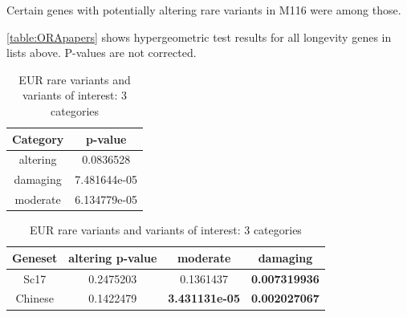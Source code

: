 \documentclass{article}\usepackage[]{graphicx}\usepackage[dvipsnames]{xcolor}
\begin{document}
Certain genes with  potentially altering rare variants in M116 were among those.

\autoref{table:ORApapers} shows hypergeometric test results for all longevity genes in lists above. P-values are not corrected.

\begin{table}[h!]
\centering
 \caption{EUR rare variants and variants of interest: 3 categories}
 \begin{tabular}{|c  c|} 
 \hline
Category  &  p-value \\ [0.5ex] 
 \hline\hline
altering & 0.0836528 \\
damaging &   7.481644e-05 \\
moderate & 6.134779e-05  \\[1ex] 
 \hline
 \end{tabular}
\label{table:ORApaperspool}
\end{table}



\begin{table}[h!]
\centering
 \caption{EUR rare variants and variants of interest: 3 categories}
 \begin{tabular}{|c c c c|} 
 \hline
Geneset &  altering p-value  & moderate & damaging \\ [0.5ex] 
 \hline\hline
Sc17 & 0.2475203  & 0.1361437  &  \textbf{0.007319936}  \\
Chinese & 0.1422479 & \textbf{3.431131e-05} & \textbf{0.002027067} \\[1ex] 
\hline
 \end{tabular}
\label{table:table:ORAmanelper}
\end{table}



\end{document}
